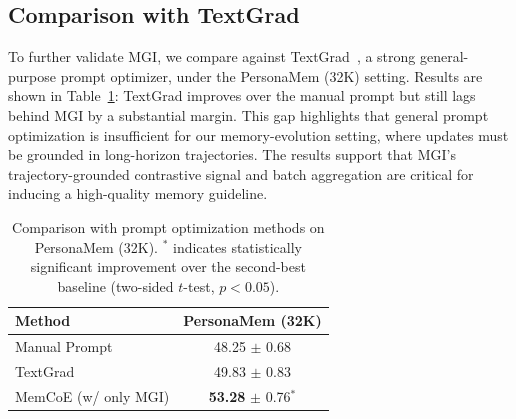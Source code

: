 \subsection{Comparison with TextGrad}
\label{subsec:prompt_opt}

To further validate MGI, we compare against TextGrad~\cite{yuksekgonul2025optimizing}, a strong general-purpose prompt optimizer, under the PersonaMem (32K) setting. Results are shown in Table~\ref{tab:prompt_opt}: TextGrad improves over the manual prompt but still lags behind MGI by a substantial margin. This gap highlights that general prompt optimization is insufficient for our memory-evolution setting, where updates must be grounded in long-horizon trajectories. The results support that MGI's trajectory-grounded contrastive signal and batch aggregation are critical for inducing a high-quality memory guideline.

\begin{table}[h]
\centering
\caption{Comparison with prompt optimization methods on PersonaMem (32K). $^*$ indicates statistically significant improvement over the second-best baseline (two-sided $t$-test, $p < 0.05$).}
\label{tab:prompt_opt}
\begin{tabular}{lc}
\toprule
\textbf{Method} & \textbf{PersonaMem (32K)} \\
\midrule
Manual Prompt         & 48.25 {\scriptsize $\pm$ 0.68} \\
TextGrad & 49.83 {\scriptsize $\pm$ 0.83} \\
MemCoE (w/ only MGI)  & \textbf{53.28} {\scriptsize $\pm$ 0.76}$^*$ \\
\bottomrule
\end{tabular}
\end{table}


